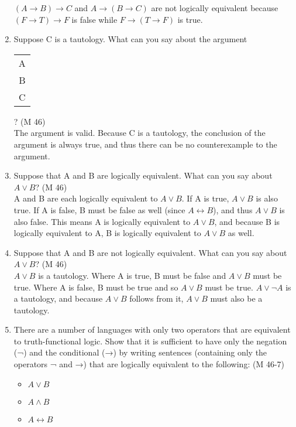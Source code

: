 \documentclass{article}
\begin{document}
\begin{enumerate}
          $(A \to B) \to C$ and $A \to (B \to C)$ are not logically equivalent because $(F \to T) \to F$ is false while $F \to (T \to F)$ is true.
    \item Suppose C is a tautology. What can you say about the argument \begin{tabular}{c}A\\B\\\hline C\end{tabular}? (M 46)\\
          The argument is valid. Because C is a tautology, the conclusion of the argument is always true, and thus there can be no counterexample to the argument.
    \item Suppose that A and B are logically equivalent. What can you say about $A \lor B$? (M 46)\\
          A and B are each logically equivalent to $A \lor B$. If A is true, $A \lor B$ is also true. If A is false, B must be false as well (since $A \leftrightarrow B$), and thus $A \lor B$ is also false. This means A is logically equivalent to $A \lor B$, and because B is logically equivalent to A, B is logically equivalent to $A \lor B$ as well.
    \item Suppose that A and B are not logically equivalent. What can you say about $A \lor B$? (M 46)\\
          $A \lor B$ is a tautology. Where A is true, B must be false and $A \lor B$ must be true. Where A is false, B must be true and so $A \lor B$ must be true. $A \lor \neg A$ is a tautology, and because $A \lor B$ follows from it, $A \lor B$ must also be a tautology.
    \item There are a number of languages with only two operators that are equivalent to truth-functional logic. Show that it is sufficient to have only the negation (¬) and the conditional (→) by writing sentences (containing only the operators ¬ and →) that are logically equivalent to the following: (M 46-7)
          \begin{itemize}
              \item $A \lor B$
              \item $A \land B$
              \item $A \leftrightarrow B$

\end{itemize}
\end{enumerate}
\end{document}
